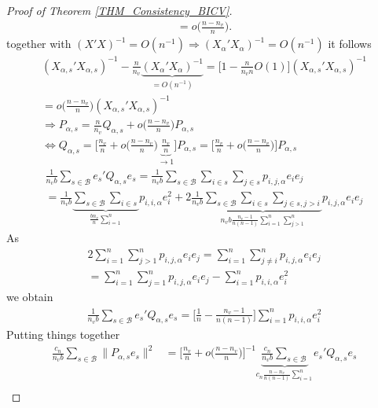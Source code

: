 \documentclass[Research_Module_ES.tex]{subfiles}
\begin{document}
\begin{proof}[Proof of Theorem \ref{THM_Consistency_BICV}]
\begin{align*}
	= o\biggl(\frac{n-n_v}{n}\biggr).
	\end{align*}
	together with $(X'X)^{-1}=O(n^{-1})\Rightarrow (X_\alpha'X_\alpha)^{-1}=O(n^{-1})$ it follows
	\begin{align*}
	(X_{\alpha,s}'X_{\alpha,s})^{-1}-\frac{n}{n_v}\underbrace{(X_{\alpha}'X_{\alpha})^{-1}}_{=O(n^{-1})} = \biggl[1-\frac{n}{n_vn}O(1)\biggr](X_{\alpha,s}'X_{\alpha,s})^{-1} \\
	= o\biggl(\frac{n-n_v}{n}\biggr)(X_{\alpha,s}'X_{\alpha,s})^{-1}\\
	\Rightarrow P_{\alpha,s}=\frac{n}{n_v}Q_{\alpha,s}+o\biggl(\frac{n-n_v}{n}\biggr)P_{\alpha,s}\\
	\iff Q_{\alpha,s} = \biggl[\frac{n_v}{n}+o\biggl(\frac{n-n_v}{n}\biggr)\underbrace{\frac{n_v}{n}}_{\to 1}\biggr]P_{\alpha,s}
	=\biggl[\frac{n_v}{n}+o\biggl(\frac{n-n_v}{n}\biggr)\biggr]P_{\alpha,s}
	\end{align*}
	\begin{align*}
	\frac{1}{n_vb}\sum_{s\in \mathcal{B}}e_s'Q_{\alpha,s}e_s
	= \frac{1}{n_vb}\sum_{s\in \mathcal{B}} \sum_{i\in s}\sum_{j\in s}p_{i,j,\alpha}e_ie_j\\
	=\frac{1}{n_vb}\underbrace{\sum_{s\in \mathcal{B}} \sum_{i\in s}}_{\frac{bn_v}{n}\sum_{i=1}^n} p_{i,i,\alpha}e_i^2 + 2\frac{1}{n_vb}\underbrace{\sum_{s\in \mathcal{B}} \sum_{i\in s}\sum_{j\in s, j>i }}_{n_vb\frac{n_v-1}{n(n-1)}\sum_{i=1}^n\sum_{j>1}^n} p_{i,j,\alpha}e_ie_j
	\end{align*}
	As
	\begin{align*}
	2\sum_{i=1}^n\sum_{j>1}^np_{i,j,\alpha}e_ie_j= \sum_{i=1}^n\sum_{j\neq i}^np_{i,j,\alpha}e_ie_j \\
	= \sum_{i=1}^n\sum_{j=1}^np_{i,j,\alpha}e_ie_j - \sum_{i=1}^np_{i,i,\alpha}e_i^2
	\end{align*}
	we obtain
	\begin{align*}
	\frac{1}{n_vb}\sum_{s\in \mathcal{B}}e_s'Q_{\alpha,s}e_s=\biggl[\frac{1}{n}-\frac{n_v-1}{n(n-1)}\biggr] \sum_{i=1}^np_{i,i,\alpha}e_i^2
	\end{align*}
	Putting things together
	\begin{align*}
	\frac{c_n}{n_vb}\sum_{s\in \mathcal{B}}\lVert P_{\alpha,s}e_s\rVert^2
	&= \biggl[\frac{n_v}{n}+o\biggl(\frac{n-n_v}{n}\biggr)\biggr]^{-1}\underbrace{\frac{c_n}{n_vb}\sum_{s\in \mathcal{B}}}_{c_n\frac{n-n_v}{n(n-1)}\sum_{i=1}^n}e_s'Q_{\alpha,s}e_s\\ 

\end{align*}
\end{proof}
\end{document}
